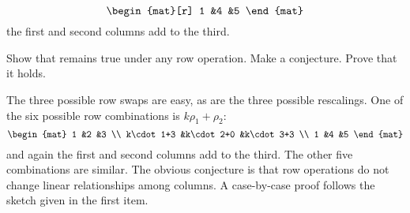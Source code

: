 \begin{exercises}
\begin{equation*}
\begin{mat}[r]
        1  &4  &5
      \end{mat}
    \end{equation*}
    the first and second columns add to the third.
    \begin{exparts}
      \partsitem Show that remains true under any row operation.
      \partsitem Make a conjecture.
      \partsitem Prove that it holds.
    \end{exparts}
    \begin{answer}
      \begin{exparts}
        \partsitem The three possible row swaps are easy, 
          as are the three possible rescalings.
          One of the six possible row combinations is \( k\rho_1+\rho_2 \):
          \begin{equation*}
            \begin{mat}
              1           &2           &3  \\
              k\cdot 1+3  &k\cdot 2+0  &k\cdot 3+3  \\
              1           &4           &5
            \end{mat}
          \end{equation*}
          and again the first and second columns add to the third.
          The other five combinations are similar.
        \partsitem The obvious conjecture is that row operations do not change
          linear relationships among columns.
        \partsitem A case-by-case 
          proof follows the sketch given in the first item.
      \end{exparts}  
   \end{answer}
\end{exercises}
